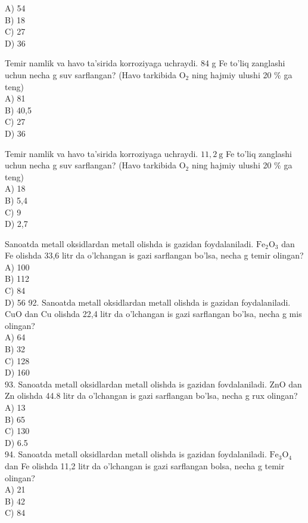 A) 54\\
B) 18\\
C) 27\\
D) 36
  \item Temir namlik va havo ta'sirida korroziyaga uchraydi. 84 g Fe to'liq zanglashi uchun necha g suv sarflangan? (Havo tarkibida $\mathrm{O}_{2}$ ning hajmiy ulushi 20 \% ga teng)\\
A) 81\\
B) 40,5\\
C) 27\\
D) 36
  \item Temir namlik va havo ta'sirida korroziyaga uchraydi. $11,2 \mathrm{~g}$ Fe to'liq zanglashi uchun necha g suv sarflangan? (Havo tarkibida $\mathrm{O}_{2}$ ning hajmiy ulushi 20 \% ga teng)\\
A) 18\\
B) 5,4\\
C) 9\\
D) 2,7
  \item Sanoatda metall oksidlardan metall olishda is gazidan foydalaniladi. $\mathrm{Fe}_{2} \mathrm{O}_{3}$ dan Fe olishda 33,6 litr da o'lchangan is gazi sarflangan bo'lsa, necha g temir olingan?\\
A) 100\\
B) 112\\
C) 84\\
D) 56
92. Sanoatda metall oksidlardan metall olishda is gazidan foydalaniladi. CuO dan Cu olishda 22,4 litr da o'lchangan is gazi sarflangan bo'lsa, necha g mis olingan?\\
A) 64\\
B) 32\\
C) 128\\
D) 160\\
93. Sanoatda metall oksidlardan metall olishda is gazidan fovdalaniladi. ZnO dan Zn olishda 44.8 litr da o'lchangan is gazi sarflangan bo'lsa, necha g rux olingan?\\
A) 13\\
B) 65\\
C) 130\\
D) 6.5\\
94. Sanoatda metall oksidlardan metall olishda is gazidan foydalaniladi. $\mathrm{Fe}_{3} \mathrm{O}_{4}$ dan Fe olishda 11,2 litr da o'lchangan is gazi sarflangan bolsa, necha g temir olingan?\\
A) 21\\
B) 42\\
C) 84\\
